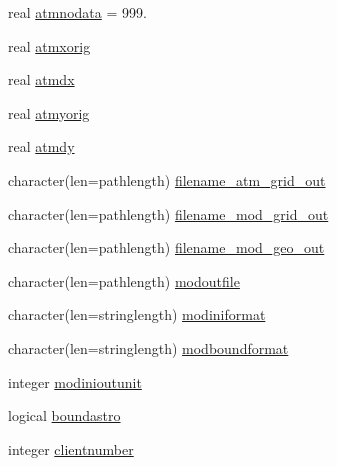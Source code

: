 \begin{DoxyCompactItemize}
real \mbox{\hyperlink{structmoduledelft3d__2__mohid_1_1t__delft3d__2__mohid_a6aca6e5586385f014eb919742e006e88}{atmnodata}} = 999.
\item 
real \mbox{\hyperlink{structmoduledelft3d__2__mohid_1_1t__delft3d__2__mohid_aaef4bf29e892f7e91bffc8886b02b05c}{atmxorig}}
\item 
real \mbox{\hyperlink{structmoduledelft3d__2__mohid_1_1t__delft3d__2__mohid_ae3ad704fdda0f0edfad6dc752d917999}{atmdx}}
\item 
real \mbox{\hyperlink{structmoduledelft3d__2__mohid_1_1t__delft3d__2__mohid_a0eb2d2d5f55ca02511a1777a8f9bb115}{atmyorig}}
\item 
real \mbox{\hyperlink{structmoduledelft3d__2__mohid_1_1t__delft3d__2__mohid_a461cddee4dc28894f0378661c6b42dd8}{atmdy}}
\item 
character(len=pathlength) \mbox{\hyperlink{structmoduledelft3d__2__mohid_1_1t__delft3d__2__mohid_a57f279eef868e8b3c03bd04b31bf3135}{filename\+\_\+atm\+\_\+grid\+\_\+out}}
\item 
character(len=pathlength) \mbox{\hyperlink{structmoduledelft3d__2__mohid_1_1t__delft3d__2__mohid_adf54d784fce30840a8574e1ccfdd9a65}{filename\+\_\+mod\+\_\+grid\+\_\+out}}
\item 
character(len=pathlength) \mbox{\hyperlink{structmoduledelft3d__2__mohid_1_1t__delft3d__2__mohid_a2054a3e307b17565f373d247b005661a}{filename\+\_\+mod\+\_\+geo\+\_\+out}}
\item 
character(len=pathlength) \mbox{\hyperlink{structmoduledelft3d__2__mohid_1_1t__delft3d__2__mohid_a3b26f020be757ecdf3e0700bb885e2a7}{modoutfile}}
\item 
character(len=stringlength) \mbox{\hyperlink{structmoduledelft3d__2__mohid_1_1t__delft3d__2__mohid_a3ec2da7cbdfb1607cf753916acaef1ab}{modiniformat}}
\item 
character(len=stringlength) \mbox{\hyperlink{structmoduledelft3d__2__mohid_1_1t__delft3d__2__mohid_a74b3aee0c3a58bf59d178b80b6f5e84e}{modboundformat}}
\item 
integer \mbox{\hyperlink{structmoduledelft3d__2__mohid_1_1t__delft3d__2__mohid_af7e1968723cb8b32e1889a116769cff8}{modinioutunit}}
\item 
logical \mbox{\hyperlink{structmoduledelft3d__2__mohid_1_1t__delft3d__2__mohid_a8ec1562840323caf4f5684d7f35a6068}{boundastro}}
\item 
integer \mbox{\hyperlink{structmoduledelft3d__2__mohid_1_1t__delft3d__2__mohid_a3a7198cf358a7f42a79d5e2027726210}{clientnumber}}
\item 

\end{DoxyCompactItemize}
